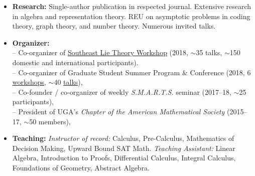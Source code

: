 \documentclass[10pt]{article}
\begin{document}
{%


\spacedhrule{0.5em}{-0.4em}

\begin{itemize}
\item \textbf{Research:} Single-author publication in respected journal. Extensive research in algebra and representation theory. REU on asymptotic problems in coding theory, graph theory, and number theory. Numerous invited talks.
\item \textbf{Organizer:}
  \\ \null \hspace{0.2em} -- Co-organizer of \href{https://www.math.lsu.edu/~pramod/selie/10/}{Southeast Lie Theory Workshop} (2018, $\sim$35 talks, $\sim$150 domestic and international participants).
  \\ \null \hspace{0.2em} -- Co-organizer of Graduate Student Summer Program \& Conference (2018, 6 \href{https://research.franklin.uga.edu/agant/professional-development-summer-2018}{workshops}, $\sim$40 \href{https://research.franklin.uga.edu/agant/mock-ams-conference-2018}{talks}),
  \\ \null \hspace{0.2em} -- Co-founder / co-organizer of weekly \emph{S.M.A.R.T.S.} seminar (2017--18, $\sim$25 participants),
  \\ \null \hspace{0.2em} -- President of UGA's \emph{Chapter of the American Mathematical Society} (2015--17, $\sim$50 members),
\item \textbf{Teaching:} \emph{Instructor of record:} Calculus, Pre-Calculus, Mathematics of Decision Making, Upward Bound SAT Math. \emph{Teaching Assistant:} Linear Algebra, Introduction to Proofs, Differential Calculus, Integral Calculus, Foundations of Geometry, Abstract Algebra.

\end{itemize}}
\end{document}
